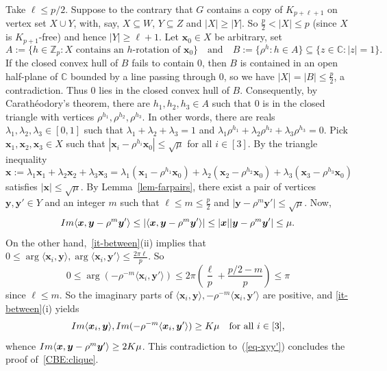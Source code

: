 \documentclass[10pt,a4paper]{article}
\newcommand\innerp[1]{\langle #1 \rangle}
\newcommand{\V}[1]{\mathbold{#1}}
\theoremstyle{definition}
\newcommand{\iminnerp}[1]{{\rm{Im}}\langle #1 \rangle}
\newcommand{\im}[1]{{\rm{Im}}(#1)}
\begin{document}
Take $\ell\le p/2$. Suppose to the contrary that $G$ contains a copy of $K_{p+\ell+1}$ on vertex set $X\cup Y$, with, say, $X\subseteq W$, $Y\subseteq Z$ and $|X|\ge |Y|$.
So $\frac{p}{2} < |X| \leq p$ (since $X$ is $K_{p+1}$-free) and hence $|Y| \geq \ell+1$.
Let $\V{x}_0 \in X$ be arbitrary, set
$$
A := \{h \in \mathbb{Z}_p: X \text{ contains an } h\text{-rotation of }\V{x}_0\}\quad\text{and}\quad B := \{\rho^h: h \in A\} \subseteq \{z \in \mathbb{C} : |z|=1\}.
$$
If the closed convex hull of $B$ fails to contain $0$, then $B$ is contained in an open half-plane of $\mathbb{C}$ bounded by a line passing through $0$, so we have $|X|=|B| \leq \frac{p}{2}$, a contradiction.
Thus $0$ lies in the closed convex hull of $B$. Consequently, by Carath\'eodory's theorem, there are $h_1,h_2,h_3 \in A$ such that $0$ is in the closed triangle with vertices $\rho^{h_1},\rho^{h_2},\rho^{h_3}$.
In other words, there are reals $\lambda_1,\lambda_2,\lambda_3 \in [0,1]$ such that $\lambda_1+\lambda_2+\lambda_3 =1$ and $\lambda_1\rho^{h_1}+\lambda_2\rho^{h_2}+\lambda_3\rho^{h_3}=0$.
Pick $\V{x}_1,\V{x}_2,\V{x}_3 \in X$ such that $|\V{x}_i-\rho^{h_i}\V{x}_0| \leq \sqrt{\mu}$ for all $i \in [3]$.
By the triangle inequality
$$
\V{x} := \lambda_1\V{x}_1+\lambda_2\V{x}_2+\lambda_3\V{x}_3 = \lambda_1(\V{x}_1-\rho^{h_1}\V{x}_0)+\lambda_2(\V{x}_2-\rho^{h_2}\V{x}_0)+\lambda_3(\V{x}_3-\rho^{h_3}\V{x}_0) 
$$
satisfies $|\V{x}| \leq \sqrt{\mu}$.
By Lemma~\ref{lem-farpairs}, there exist a pair of vertices $\V{y},\V{y}' \in Y$ and an integer $m$ such that $\ell \leq m \leq \frac{p}{2}$ and $|\V{y}-\rho^m\V{y}'| \leq \sqrt{\mu}$. Now,
\begin{equation}\label{eq-xyy'}
\iminnerp{\V{x},\V{y}-\rho^m\V{y}'} \leq |\innerp{\V{x},\V{y}-\rho^m\V{y}'}| \leq |\V{x}||\V{y}-\rho^m\V{y}'| \leq \mu.
\end{equation}
 On the other hand,~\ref{it-between}(ii) implies that $0 \leq \arg\innerp{\V{x}_i,\V{y}}, \arg\innerp{\V{x}_i,\V{y}'} \leq \frac{2\pi\ell}{p}$. So
 $$
 0 \leq \arg(-\rho^{-m}\innerp{\V{x}_i,\V{y}'}) \leq 2\pi\left(\frac{\ell}{p}+\frac{p/2-m}{p}\right) \leq \pi
 $$
 since $\ell \leq m$.
 So the imaginary parts of $\innerp{\V{x}_i,\V{y}},-\rho^{-m}\innerp{\V{x}_i,\V{y}'}$ are positive, and
 \ref{it-between}(i) yields
$$
\iminnerp{\V{x}_i,\V{y}}, \im{-\rho^{-m}\innerp{\V{x}_i,\V{y}'}} \geq K\mu\quad\text{for all }i \in [3], 
$$
whence $\iminnerp{\V{x},\V{y}-\rho^m\V{y}'} \geq 2K\mu$.
This contradiction to~(\ref{eq-xyy'}) concludes the proof of~\ref{CBE:clique}.
\end{document}
